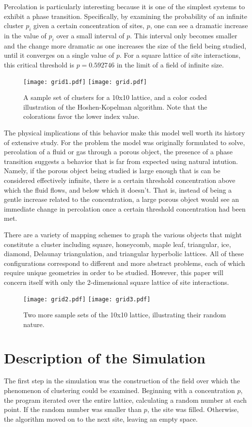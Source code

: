 \documentclass[twocolumn,prb,amsmath,amssymb,amsfonts]{revtex4}
\begin{document}
Percolation is particularly interesting because it is one of the simplest systems to exhibit a phase transition. Specifically, by examining the probability of an infinite cluster $p_i$ given a certain concentration of sites, $p$, one can see a dramatic increase in the value of $p_i$ over a small interval of $p$. This interval only becomes smaller and the change more dramatic as one increases the size of the field being studied, until it converges on a single value of $p$. For a square lattice of site interactions, this critical threshold is $p=0.592746$ in the limit of a field of infinite size.
\begin{figure}
\texttt{[image: grid1.pdf]}
\texttt{[image: grid.pdf]}
\caption{A sample set of clusters for a 10x10 lattice, and a color coded illustration of the Hoshen-Kopelman algorithm. Note that the colorations favor the lower index value.}
\end{figure}
The physical implications of this behavior make this model well worth its history of extensive study. For the problem the model was originally formulated to solve, percolation of a fluid or gas through a porous object, the presence of a phase transition suggests a behavior that is far from expected using natural intution. Namely, if the porous object being studied is large enough that is can be considered effectively infinite, there is a certain threshold concentration above which the fluid flows, and below which it doesn't. That is, instead of being a gentle increase related to the concentration, a large porous object would see an immediate change in percolation once a certain threshold concentration had been met. 

There are a variety of mapping schemes to graph the various objects that might constitute a cluster including square, honeycomb, maple leaf, triangular, ice, diamond, Delaunay triangulation, and triangular hyperbolic lattices. All of these configurations correspond to different and more abstract problems, each of which require unique geometries in order to be studied. However, this paper will concern itself with only the 2-dimensional square lattice of site interactions. 
\begin{figure}
\texttt{[image: grid2.pdf]}
\texttt{[image: grid3.pdf]}
\caption{Two more sample sets of the 10x10 lattice, illustrating their random nature.}
\end{figure}

\section{Description of the Simulation}
The first step in the simulation was the construction of the field over which the phenomenon of clustering could be examined. Beginning with a concentration $p$, the program iterated over the entire lattice, calculating a random number at each point. If the random number was smaller than $p$, the site was filled. Otherwise, the algorithm moved on to the next site, leaving an empty space. 
\end{document}
